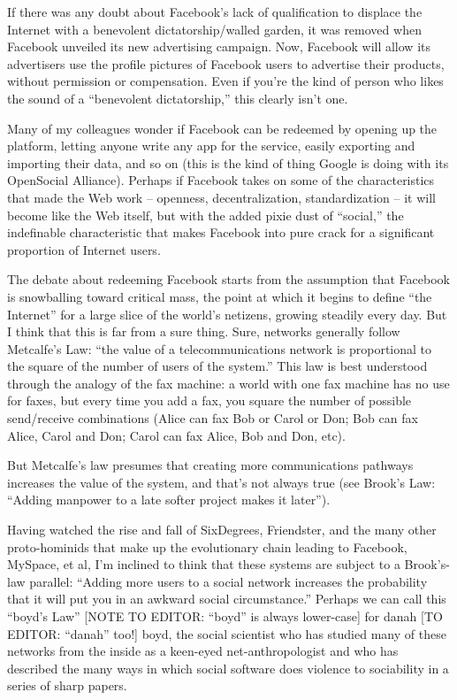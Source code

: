 If there was any doubt about Facebook's lack of qualification to
displace the Internet with a benevolent dictatorship/walled garden,
it was removed when Facebook unveiled its new advertising campaign.
Now, Facebook will allow its advertisers use the profile pictures
of Facebook users to advertise their products, without permission
or compensation. Even if you're the kind of person who likes the
sound of a ``benevolent dictatorship,'' this clearly isn't one.

Many of my colleagues wonder if Facebook can be redeemed by opening
up the platform, letting anyone write any app for the service,
easily exporting and importing their data, and so on (this is the
kind of thing Google is doing with its OpenSocial Alliance).
Perhaps if Facebook takes on some of the characteristics that made
the Web work -- openness, decentralization, standardization -- it
will become like the Web itself, but with the added pixie dust of
``social,'' the indefinable characteristic that makes Facebook into
pure crack for a significant proportion of Internet users.

The debate about redeeming Facebook starts from the assumption that
Facebook is snowballing toward critical mass, the point at which it
begins to define ``the Internet'' for a large slice of the world's
netizens, growing steadily every day. But I think that this is far
from a sure thing. Sure, networks generally follow Metcalfe's Law:
``the value of a telecommunications network is proportional to the
square of the number of users of the system.'' This law is best
understood through the analogy of the fax machine: a world with one
fax machine has no use for faxes, but every time you add a fax, you
square the number of possible send/receive combinations (Alice can
fax Bob or Carol or Don; Bob can fax Alice, Carol and Don; Carol
can fax Alice, Bob and Don, etc).

But Metcalfe's law presumes that creating more communications
pathways increases the value of the system, and that's not always
true (see Brook's Law: ``Adding manpower to a late softer project
makes it later'').

Having watched the rise and fall of SixDegrees, Friendster, and the
many other proto-hominids that make up the evolutionary chain
leading to Facebook, MySpace, et al, I'm inclined to think that
these systems are subject to a Brook's-law parallel: ``Adding more
users to a social network increases the probability that it will
put you in an awkward social circumstance.'' Perhaps we can call
this ``boyd's Law'' [NOTE TO EDITOR: ``boyd'' is always lower-case] for
danah [TO EDITOR: ``danah'' too!] boyd, the social scientist who has
studied many of these networks from the inside as a keen-eyed
net-anthropologist and who has described the many ways in which
social software does violence to sociability in a series of sharp
papers.

